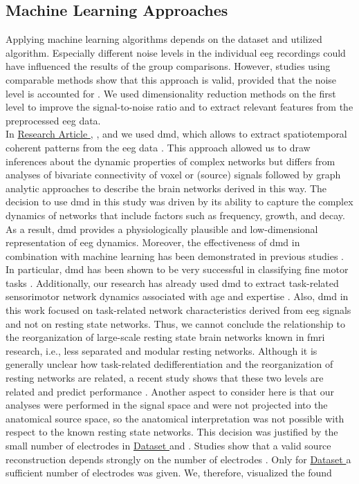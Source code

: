 \subsection{Machine Learning Approaches}
Applying machine learning algorithms depends on the dataset and utilized algorithm. Especially different noise levels in the individual \gls{eeg} recordings could have influenced the results of the group comparisons. However, studies using comparable methods show that this approach is valid, provided that the noise level is accounted for \cite{Bae2020, Vahid2020}. We used dimensionality reduction methods on the first level to improve the signal-to-noise ratio and to extract relevant features from the preprocessed \gls{eeg} data.\\
In \hyperref[results:paperI]{Research Article }, \hyperref[results:paperIII]{}, and \hyperref[results:paperIV]{} we used \gls{dmd}, which allows to extract spatiotemporal coherent patterns from the \gls{eeg} data \cite{Brunton2016}. This approach allowed us to draw inferences about the dynamic properties of complex networks but differs from analyses of bivariate connectivity of voxel or (source) signals followed by graph analytic approaches to describe the brain networks derived in this way. The decision to use \gls{dmd} in this study was driven by its ability to capture the complex dynamics of networks that include factors such as frequency, growth, and decay. As a result, \gls{dmd} provides a physiologically plausible and low-dimensional representation of \gls{eeg} dynamics. Moreover, the effectiveness of \gls{dmd} in combination with machine learning has been demonstrated in previous studies \cite{Brunton2016, Kunert-Graf2019, Shiraishi2020}. In particular, \gls{dmd} has been shown to be very successful in classifying fine motor tasks \cite{Shiraishi2020}. Additionally, our research has already used \gls{dmd} to extract task-related sensorimotor network dynamics associated with age and expertise \cite{Vieluf2018, Goelz2018}. Also, \gls{dmd} in this work focused on task-related network characteristics derived from \gls{eeg} signals and not on resting state networks. Thus, we cannot conclude the relationship to the reorganization of large-scale resting state brain networks known in \gls{fmri} research, i.e., less separated and modular resting networks. Although it is generally unclear how task-related dedifferentiation and the reorganization of resting networks are related, a recent study shows that these two levels are related and predict performance \cite{Cassedy2020netw_distinct}. Another aspect to consider here is that our analyses were performed in the signal space and were not projected into the anatomical source space, so the anatomical interpretation was not possible with respect to the known resting state networks. This decision was justified by the small number of electrodes in \hyperref[methods:datasets:I]{Dataset } and \hyperref[methods:datasets:II]{}. Studies show that a valid source reconstruction depends strongly on the number of electrodes \cite{Song2015, Lantz2003}. Only for \hyperref[methods:datasets:III]{Dataset } a sufficient number of electrodes was given. We, therefore, visualized the found 